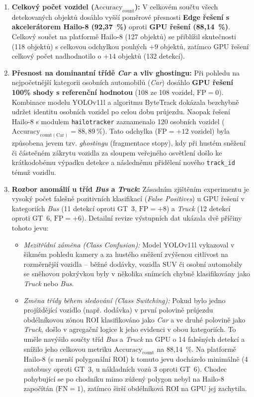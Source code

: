 \documentclass[male,czech,api_bc]{kitheses}
\begin{document}
\begin{enumerate}
    \item \textbf{Celkový počet vozidel ($\text{Accuracy}_{\text{count}}$):} V celkovém součtu všech detekovaných objektů dosáhlo vyšší poměrové přesnosti \textbf{Edge řešení s akcelerátorem Hailo-8 (92,37~\%)} oproti \textbf{GPU řešení (88,14~\%)}. Celkový součet na platformě Hailo-8 (127 objektů) se přiblížil skutečnosti (118 objektů) s celkovou odchylkou pouhých $+9$ objektů, zatímco GPU řešení celkový počet nadhodnotilo o $+14$ objektů (132 detekcí).
    
    \item \textbf{Přesnost na dominantní třídě \textit{Car} a vliv ghostingu:} Při pohledu na nejpočetnější kategorii osobních automobilů (\textit{Car}) dosáhlo \textbf{GPU řešení 100\% shody s referenční hodnotou} (108 ze 108 vozidel, $\text{FP}=0$). Kombinace modelu YOLOv11l a algoritmu ByteTrack dokázala bezchybně udržet identitu osobních vozidel po celou dobu průjezdu. Naopak řešení Hailo-8 s modulem \texttt{hailotracker} zaznamenalo 120 osobních vozidel ($\text{Accuracy}_{\text{count}(\text{Car})} = 88{,}89~\%$). Tato odchylka ($\text{FP} = +12$ vozidel) byla způsobena jevem tzv. \textit{ghostingu} (fragmentace stopy), kdy při hustém sněžení či částečném zákrytu vozidla za sloupem veřejného osvětlení došlo ke krátkodobému výpadku detekce a následnému přidělení nového \texttt{track\_id} témuž vozidlu.
    
    \item \textbf{Rozbor anomálií u tříd \textit{Bus} a \textit{Truck}:} Zásadním zjištěním experimentu je vysoký počet falešně pozitivních klasifikací (\textit{False Positives}) u GPU řešení v kategoriích \textit{Bus} (11 detekcí oproti GT~3, $\text{FP}=+8$) a \textit{Truck} (12 detekcí oproti GT~6, $\text{FP}=+6$). Detailní revize výstupních dat ukázala dvě příčiny tohoto jevu:
    \begin{itemize}
        \item \textit{Mezitřídní záměna (Class Confusion):} Model YOLOv11l vykazoval v šikmém pohledu kamery a za hustého sněžení zvýšenou citlivost na rozměrnější vozidla – běžné dodávky, vozidla SUV či osobní automobily se sněhovou pokrývkou byly v několika snímcích chybně klasifikovány jako \textit{Truck} nebo \textit{Bus}.
        \item \textit{Změna třídy během sledování (Class Switching):} Pokud bylo jedno projíždějící vozidlo (např. dodávka) v první polovině průjezdu obdélníkovou zónou ROI klasifikováno jako \textit{Car} a ve druhé polovině jako \textit{Truck}, došlo v agregační logice k jeho evidenci v obou kategoriích. To uměle navýšilo součty tříd \textit{Bus} a \textit{Truck} na GPU o 14 falešných detekcí a snížilo jeho celkovou metriku $\text{Accuracy}_{\text{count}}$ na 88,14~\%. Na platformě Hailo-8 (s menší polygonální ROI) k tomuto jevu docházelo minimálně (4 autobusy oproti GT~3, u nákladních vozů 3 oproti GT~6). Chodec pohybující se po chodníku mimo zúžený polygon nebyl na Hailo-8 započítán ($\text{FN}=1$), zatímco širší obdélníková ROI na GPU jej zachytila.
    \end{itemize}
\end{enumerate}
\end{document}
